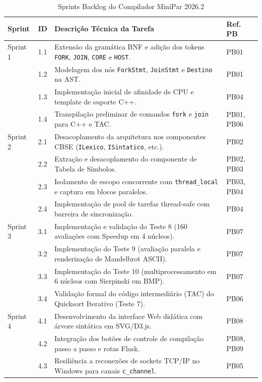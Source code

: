 \begin{table}[htbp]
\centering
\caption{Sprints Backlog do Compilador MiniPar 2026.2}
\label{tab:sprints_backlog}
\small
\begin{tabular}{p{1.8cm}p{1.0cm}p{9.4cm}p{1.8cm}}
\toprule
Sprint & ID & Descrição Técnica da Tarefa & Ref. PB \\
\midrule
Sprint 1 & 1.1 & Extensão da gramática BNF e adição dos tokens \texttt{FORK}, \texttt{JOIN}, \texttt{CORE} e \texttt{HOST}. & PB01 \\
         & 1.2 & Modelagem dos nós \texttt{ForkStmt}, \texttt{JoinStmt} e \texttt{Destino} na AST. & PB01 \\
         & 1.3 & Implementação inicial de afinidade de CPU e template de suporte C++. & PB04 \\
         & 1.4 & Transpilação preliminar de comandos \texttt{fork} e \texttt{join} para C++ e TAC. & PB01, PB06 \\
\midrule
Sprint 2 & 2.1 & Desacoplamento da arquitetura nos componentes CBSE (\texttt{ILexico}, \texttt{ISintatico}, etc.). & PB02 \\
         & 2.2 & Extração e desacoplamento do componente de Tabela de Símbolos. & PB02, PB03 \\
         & 2.3 & Isolamento de escopo concorrente com \texttt{thread\_local} e captura em blocos paralelos. & PB03, PB04 \\
         & 2.4 & Implementação de pool de tarefas thread-safe com barreira de sincronização. & PB04 \\
\midrule
Sprint 3 & 3.1 & Implementação e validação do Teste 8 (160 avaliações com Speedup em 4 núcleos). & PB07 \\
         & 3.2 & Implementação do Teste 9 (avaliação paralela e renderização de Mandelbrot ASCII). & PB07 \\
         & 3.3 & Implementação do Teste 10 (multiprocessamento em 6 núcleos com Sierpinski em BMP). & PB07 \\
         & 3.4 & Validação formal do código intermediário (TAC) do Quicksort Iterativo (Teste 7). & PB06 \\
\midrule
Sprint 4 & 4.1 & Desenvolvimento da interface Web didática com árvore sintática em SVG/D3.js. & PB08 \\
         & 4.2 & Integração dos botões de controle de compilação passo a passo e rotas Flask. & PB08, PB09 \\
         & 4.3 & Resiliência a reconexões de sockets TCP/IP no Windows para canais \texttt{c\_channel}. & PB05 \\

\end{tabular}
\end{table}
